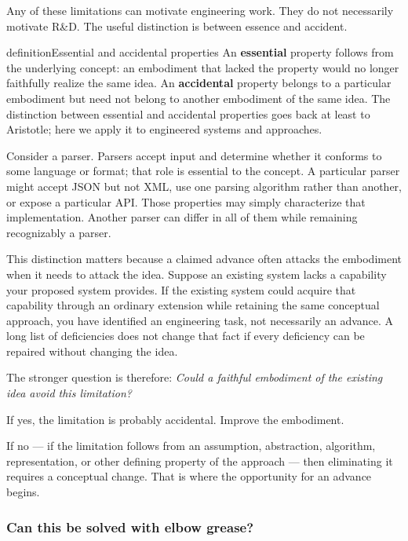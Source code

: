 Any of these limitations can motivate engineering work. They do not necessarily motivate R\&D. The
useful distinction is between essence and accident.

\begin{bookbox}{definition}{Essential and accidental properties} %
An \textbf{essential} property follows from the underlying concept: an embodiment that lacked the
property would no longer faithfully realize the same idea. An \textbf{accidental} property belongs to a
particular embodiment but need not belong to another embodiment of the same idea. The distinction
between essential and accidental properties goes back at least to Aristotle; here we apply it to
engineered systems and approaches.

Consider a parser. Parsers accept input and determine whether it conforms to some language or
format; that role is essential to the concept. A particular parser might accept JSON but not XML,
use one parsing algorithm rather than another, or expose a particular API. Those properties may
simply characterize that implementation. Another parser can differ in all of them while remaining
recognizably a parser.
\end{bookbox}

This distinction matters because a claimed advance often attacks the embodiment when it needs to
attack the idea. Suppose an existing system lacks a capability your proposed system provides. If
the existing system could acquire that capability through an ordinary extension while retaining the
same conceptual approach, you have identified an engineering task, not necessarily an advance. A
long list of deficiencies does not change that fact if every deficiency can be repaired without
changing the idea.

The stronger question is therefore: \emph{Could a faithful embodiment of the existing idea avoid this
limitation?}

If yes, the limitation is probably accidental. Improve the embodiment.

If no --- if the limitation follows from an assumption, abstraction, algorithm, representation, or
other defining property of the approach --- then eliminating it requires a conceptual change. That is
where the opportunity for an advance begins.

\subsubsection{Can this be solved with elbow grease?}\label{sec-elbow-grease}

